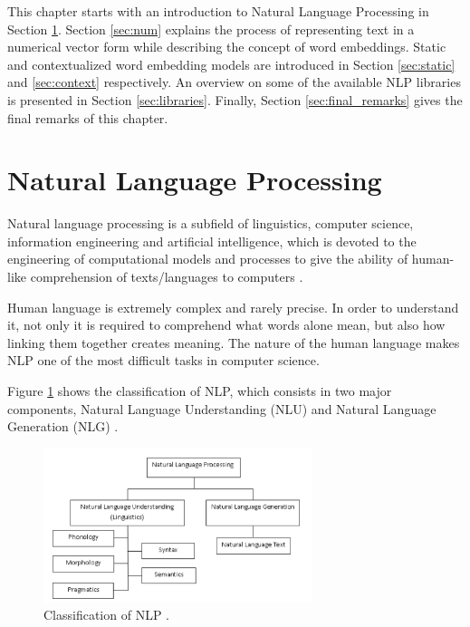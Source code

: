 This chapter starts with an introduction to Natural Language Processing in Section \ref{sec:nlp}. Section \ref{sec:num} explains the process of representing text in a numerical vector form while describing the concept of word embeddings. Static and contextualized word embedding models are introduced in Section \ref{sec:static} and \ref{sec:context} respectively. An overview on some of the available NLP libraries is presented in Section \ref{sec:libraries}. Finally, Section \ref{sec:final_remarks} gives the final remarks of this chapter.

\newpage
\section{Natural Language Processing}
\label{sec:nlp}

Natural language processing is a subfield of linguistics, computer science, information engineering and artificial intelligence, which is devoted to the engineering of computational models and processes to give the ability of human-like comprehension of texts/languages to computers \cite{Khurana2018}. 

Human language is extremely complex and rarely precise. In order to understand it, not only it is required to comprehend what words alone mean, but also how linking them together creates meaning. The nature of the human language makes NLP one of the most difficult tasks in computer science. 

Figure \ref{fig:nlp_class} shows the classification of NLP, which consists in two major components, Natural Language Understanding (NLU) and Natural Language Generation (NLG) \cite{Khurana2018}.  \par




\begin{figure}[htb]
    \centering
    \captionsetup{justification=centering}
    \includegraphics[width=0.7\textwidth]{Sections/3StateOfTheArt/3_images/NLP_diagram.png}
    \caption[Classification of NLP.]{Classification of NLP \cite{Khurana2018}.}  
    \label{fig:nlp_class} 
\end{figure}

